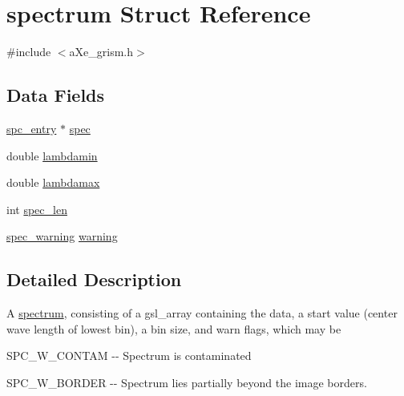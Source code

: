 \hypertarget{structspectrum}{
\section{spectrum Struct Reference}
\label{structspectrum}
}


{\ttfamily \#include $<$aXe\_\-grism.h$>$}\subsection*{Data Fields}
\begin{DoxyCompactItemize}
\item 
\hyperlink{structspc__entry}{spc\_\-entry} $\ast$ \hyperlink{structspectrum_a12640df5c0e35a9a377291dd11022bcf}{spec}
\item 
double \hyperlink{structspectrum_a0c1fc08d8e906a2cf2309c7a88761fd6}{lambdamin}
\item 
double \hyperlink{structspectrum_af417db865af6ae56481377ad9b0f0eff}{lambdamax}
\item 
int \hyperlink{structspectrum_a7f1df316451ab775f47013bc7c556f08}{spec\_\-len}
\item 
\hyperlink{aXe__grism_8h_ab270beca374e5418146b4b1d31657b49}{spec\_\-warning} \hyperlink{structspectrum_a9db80753621188168361c845f8c2bd9a}{warning}
\end{DoxyCompactItemize}


\subsection{Detailed Description}
A \hyperlink{structspectrum}{spectrum}, consisting of a gsl\_\-array containing the data, a start value (center wave length of lowest bin), a bin size, and warn flags, which may be 
\begin{DoxyItemize}
\item SPC\_\-W\_\-CONTAM -\/-\/ Spectrum is contaminated 
\item SPC\_\-W\_\-BORDER -\/-\/ Spectrum lies partially beyond the image borders. 
\end{DoxyItemize}

